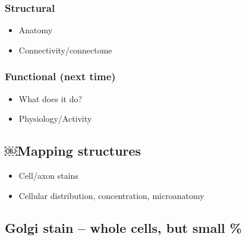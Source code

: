 \documentclass[]{article}
\providecommand{\tightlist}{%
  \setlength{\itemsep}{0pt}\setlength{\parskip}{0pt}}
\begin{document}
\hypertarget{structural}{%
\subsubsection{Structural}\label{structural}}

\begin{itemize}
\tightlist
\item
  Anatomy
\item
  Connectivity/connectome
\end{itemize}

\hypertarget{functional-next-time}{%
\subsubsection{Functional (next time)}\label{functional-next-time}}

\begin{itemize}
\tightlist
\item
  What does it do?
\item
  Physiology/Activity
\end{itemize}

\hypertarget{mapping-structures}{%
\subsection{￼Mapping structures}\label{mapping-structures}}

\begin{itemize}
\tightlist
\item
  Cell/axon stains
\item
  Cellular distribution, concentration, microanatomy
\end{itemize}

\hypertarget{golgi-stain-whole-cells-but-small}{%
\subsection{\texorpdfstring{\textbf{Golgi stain} -- whole cells, but
small
\%}{Golgi stain -- whole cells, but small \%}}\label{golgi-stain-whole-cells-but-small}}
\end{document}
